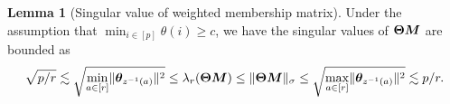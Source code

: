 \documentclass[lettersize,onecolumn,journal]{IEEEtran}
\theoremstyle{definition}
\newtheorem{lem}{Lemma}
\theoremstyle{definition}
\newcommand{\ang}[1]{\left\langle#1\right\rangle}
\def\fixme#1#2{\textbf{\color{red}[FIXME (#1): #2]}}
\begin{document}


\begin{lem}[Singular value of weighted membership matrix]\label{lem:singular_thetam} Under the assumption that $\min_{i \in [p]} \theta(i) \geq c$, we have the singular values of $\boldsymbol{\Theta} \bm M$ are bounded as 
\begin{equation}\label{eq:membership2}
     \sqrt{p/r} \lesssim \sqrt{ \min_{a \in [r]}\onormSize{}{ \mtheta_{ z^{-1}(a)} }^2 }  \leq \lambda_{r}(\mTheta \mM) \leq \onormSize{}{\mTheta \mM}_{\sigma} \leq\sqrt{ \max_{a \in [r]}\onormSize{}{ \mtheta_{ z^{-1}(a)} }^2 } \lesssim  p /r .
\end{equation}
\end{lem}
\end{document}
